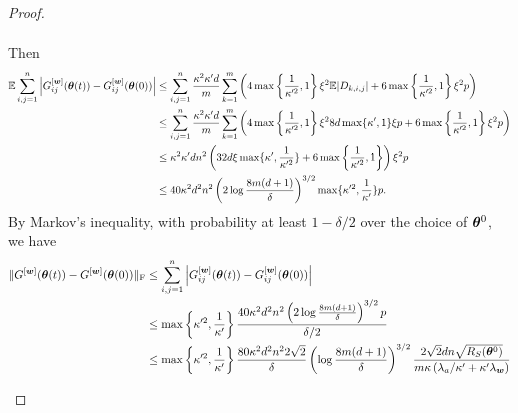 \documentclass{article}
\begin{document}
\begin{proof}
\begin{enumerate}[(a)]
\begin{enumerate}[(i)]
\begin{equation*}
\begin{aligned}
                            \end{aligned}
                        \end{equation*}
                        Then
                        \begin{equation*}
                            \begin{aligned}
                                \mathbb{E}\sum_{i,j=1}^n\left\lvert G_{ij}^{[\bm{w}]}(\bm{\theta}(t))-G_{ij}^{[\bm{w}]}(\bm{\theta}(0))\right\rvert
                                 & \leq\sum_{i,j=1}^n\frac{\kappa^2\kappa' d}{m}\sum_{k=1}^m\left(4\max\left\{\frac{1}{\kappa'^2},1\right\}\xi^2\mathbb{E}|D_{k,i,j}|+6\max\left\{\frac{1}{\kappa'^2},1\right\}\xi^2 p\right)           \\
                                 & \leq\sum_{i,j=1}^n\frac{\kappa^2\kappa' d}{m}\sum_{k=1}^m\left(4\max\left\{\frac{1}{\kappa'^2},1\right\}\xi^2 8d\max\{\kappa',1\}\xi p+6\max\left\{\frac{1}{\kappa'^2},1\right\}\xi^2 p\right) \\
                                 & \leq \kappa^2\kappa' d n^2\left(32d\xi\max\{\kappa',\frac{1}{\kappa'^2} \}   +6\max\left\{\frac{1}{\kappa'^2},1\right\}\right)\xi^2 p                                                          \\
                                 & \leq 40\kappa^2 d^2n^2\left(2\log\frac{8m(d+1)}{\delta}\right)^{3/2}\max\{\kappa'^2,\frac{1}{\kappa'}\} p.
                            \end{aligned}
                        \end{equation*}
                        By Markov's inequality, with probability at least $1-\delta/2$ over the choice of $\bm{\theta}^0$, we have
                        \begin{equation*}
                            \begin{aligned}
                                \norm{G^{[\vw]}(\vtheta(t))-G^{[\vw]}(\vtheta(0))}_\mathrm{F}
                                 & \leq \sum_{i,j=1}^n\Big|G_{ij}^{[\vw]}(\vtheta(t))-G^{[\vw]}_{ij}(\vtheta(0))\Big|                                                                                                                                                 \\
                                 & \leq \max\left\{\kappa'^2,\frac{1}{\kappa'}\right\}\frac{40\kappa^2 d^2n^2\left(2\log\frac{8m(d+1)}{\delta}\right)^{3/2} p}{\delta/2}                                                                                                         \\
                                 & \leq \max\left\{\kappa'^2,\frac{1}{\kappa'}\right\}\frac{80\kappa^2 d^2n^2 2\sqrt{2}}{\delta}\left(\log\frac{8m(d+1)}{\delta}\right)^{3/2}\frac{2\sqrt{2}dn\sqrt{\RS(\vtheta^0)}}{m\kappa\left(\lambda_a/\kappa'+\kappa'\lambda_{\vw}\right)} \\

\end{aligned}
\end{equation*}
\end{enumerate}
\end{enumerate}
\end{proof}
\end{document}
